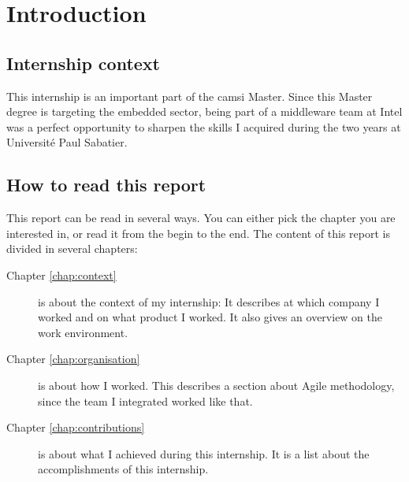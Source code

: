 \chapter{Introduction}

\section{Internship context}
This internship is an important part of the \gls{camsi} Master.
Since this Master degree is targeting the embedded sector, being part of a middleware team at Intel
was a perfect opportunity to sharpen the skills I acquired during the two years at Université Paul Sabatier.

\section{How to read this report}

This report can be read in several ways. You can either pick the chapter you are
interested in, or read it from the begin to the end. The content of this report
is divided in several chapters:

\begin{description}
    \item[Chapter \ref{chap:context}] is about the context of my internship: It describes at which company I worked and on what product I worked.
        It also gives an overview on the work environment.
    \item[Chapter \ref{chap:organisation}] is about how I worked. This describes a section about Agile methodology, since the
        team I integrated worked like that.
    \item[Chapter \ref{chap:contributions}] is about what I achieved during this internship. It is a list about the accomplishments
        of this internship.
\end{description}
